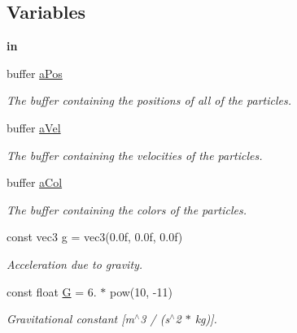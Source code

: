 \subsection*{Variables}
\begin{DoxyCompactItemize}
\item 
\mbox{\label{particle__attraction_8comp_a64b0840001d30ff8cd416759a03542ce}} 
{\bfseries in}
\item 
buffer \hyperlink{particle__attraction_8comp_a9f39e8aaa860ed0953f27908a3b221d0}{a\+Pos}
\begin{DoxyCompactList}\small\item\em The buffer containing the positions of all of the particles. \end{DoxyCompactList}\item 
buffer \hyperlink{particle__attraction_8comp_a8873b6c4414371b20f8c9adb4fbb0b0e}{a\+Vel}
\begin{DoxyCompactList}\small\item\em The buffer containing the velocities of the particles. \end{DoxyCompactList}\item 
buffer \hyperlink{particle__attraction_8comp_a41cc0a0d722413ed428da01e38311893}{a\+Col}
\begin{DoxyCompactList}\small\item\em The buffer containing the colors of the particles. \end{DoxyCompactList}\item 
\mbox{\label{particle__attraction_8comp_afbfc2de3569f43befe0b8abf8ff644e3}} 
const vec3 \hyperlink{particle__attraction_8comp_afbfc2de3569f43befe0b8abf8ff644e3}{g} = vec3(0.\+0f, 0.\+0f, 0.\+0f)
\begin{DoxyCompactList}\small\item\em Acceleration due to gravity. \end{DoxyCompactList}\item 
\mbox{\label{particle__attraction_8comp_accf9cafc36aeda21688e19a1c2d3888d}} 
const float \hyperlink{particle__attraction_8comp_accf9cafc36aeda21688e19a1c2d3888d}{G} = 6. $\ast$ pow(10, -\/11)
\begin{DoxyCompactList}\small\item\em Gravitational constant \mbox{[}m$^\wedge$3 / (s$^\wedge$2 $\ast$ kg)\mbox{]}. \end{DoxyCompactList}\item 

\end{DoxyCompactItemize}
